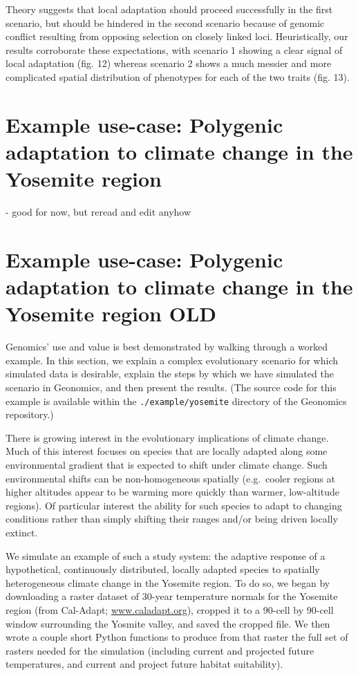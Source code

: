﻿\documentclass{article}
\begin{document}
Theory suggests that local adaptation should proceed successfully in the first scenario, but should be
hindered in the second scenario because of genomic conflict resulting from opposing selection
on closely linked loci.
Heuristically, our results corroborate these expectations, with scenario 1 showing a clear
signal of local adaptation (fig. 12) whereas scenario 2 shows a much messier and more complicated
spatial distribution of phenotypes for each of the two traits (fig. 13).


\section{Example use-case: Polygenic adaptation to climate change in the Yosemite region}
- good for now, but reread and edit anyhow


\section{Example use-case: Polygenic adaptation to climate change in the Yosemite region OLD}

Genomics' use and value is best demonstrated by walking through a worked example.
In this section, we explain a complex evolutionary scenario for which 
simulated data is desirable, explain the steps by which we have simulated the
scenario in Geonomics, and then present the results.
(The source code for this example is available within the
\texttt{./example/yosemite} directory of the Geonomics repository.)

There is growing interest in the evolutionary implications of climate change.
Much of this interest focuses on species that are locally adapted along some
environmental gradient that is expected to shift under climate change.
Such environmental shifts can be non-homogeneous spatially
(e.g.\ cooler regions at higher altitudes appear to be warming more
quickly than warmer, low-altitude regions).
Of particular interest the ability for such species to adapt
to changing conditions rather than simply shifting their ranges
and/or being driven locally extinct.

We simulate an example of such a study system: the adaptive
response of a hypothetical, continuously distributed, locally adapted species
to spatially heterogeneous climate change in the Yosemite region.
To do so, we began by downloading a raster dataset of 30-year
temperature normals for the Yosemite region (from Cal-Adapt; \url{www.caladapt.org}),
cropped it to a 90-cell by 90-cell window surrounding the Yosmite valley,
and saved the cropped file.
We then wrote a couple short Python functions to produce from that raster
the full set of rasters needed for the simulation
(including current and projected future temperatures,
and current and project future habitat suitability).
\end{document}
